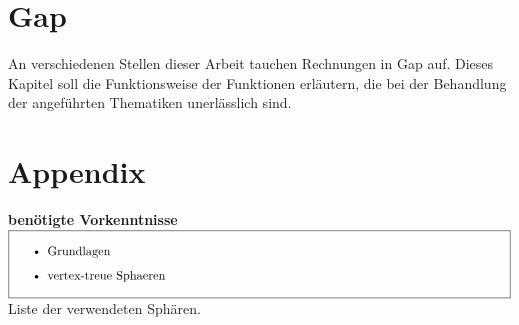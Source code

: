 \documentclass[12pt,titlepage,twoside,cleardoublepage]{article}
\theoremstyle{nummermitklammern}
\newtheorem{bemerkung}[temp]{Bemerkung}
\newtheorem{satz}[temp]{Satz}
\newtheorem{bemerkung}[zahl]{Bemerkung}
\newtheorem{satz}[zahl]{Satz}
\numberwithin{equation}{section}
\begin{document}
\section{Gap}
An verschiedenen Stellen dieser Arbeit tauchen Rechnungen in Gap auf. Dieses Kapitel soll die Funktionsweise der Funktionen erläutern, die bei der Behandlung der angeführten Thematiken unerlässlich sind. 
\begin{comment}
\begin{satz}
Sei $(X,<)$ eine vertex-treue  Sphäre und $e\in X_1$ eine Kante, die folgendes erfüllt 
\[
deg(V)=4 \forall V\in X_0(X_2(e)).
\]
 Dann ist $X \cong O$, wobei $(O,<_O)$ der bereits bekannte Oktaeder ist. 
\end{satz}
\[
\textcolor{red}{Anzahl}
\]
\begin{proof}
Für den Beweis nutzen wir die zuvor definierte Butterfly Deletion. Sei $X$ eine vertex-treue Sphäre mit obiger Eigenschaft. Dann bildet $Y=\textcolor{red}{e\beta(X)}$ eine simpliziale Fläche mit den Knoten $V,V',V''$ und Kanten $e',e''$, wobei
\begin{align*}
&deg(V)=4\\
&deg(V')=deg(V'')=3\\
&X_0(e')=\{V,V'\}\\
&X_0(e')=\{V,V''\}
\end{align*}
gilt.  Ein erneutes Anwenden der Butterfly Deletion liefert und die Sphäre $Z=\textcolor{red}{e\beta(Y)}$ mit $\bar{V}\in Z_0$ und $\bar{e}\in Z_1$, die $X_0(\bar{e})=\{\bar{V},V''\}$ erfüllen. Damit ist $Z\cong T$, da $\bar{V}$ und $V''$ benachbarte Knoten vom Grad $3$ sind.
Damit ist $Y$ isomorph zum Double-Tetraeder $DT$ und schlussendlich erhält man die obige Behauptung.
\end{proof}
\begin{bemerkung}
Falls bei der obigen Formulierung des Satzes auf die Voraussetzung der Vertex-Treue verzichtet wird, so ist die Aussage falsch. Denn die simpliziale Fläche, die dadurch entsteht, dass man sich eine beliebige Kante des Oktaeders nimmt, einen Cratercut an dieser durchführt und an den neu entstandenen Randkanten einen Open-Bag anheftet, erfüllt dann die Voraussetzung der schwächeren Umformulierung. Diese ist jedoch nicht zum Oktaeder isomorph.
\end{bemerkung}
\end{comment}

\section*{Appendix}
\textbf{benötigte Vorkenntnisse} \\
$\fbox{
\parbox{14cm}{\begin{itemize}
\item Grundlagen
\item vertex-treue Sphaeren
\end{itemize}
}}$\\
Liste der verwendeten Sphären.
 

\pagestyle{empty}
\end{document}

